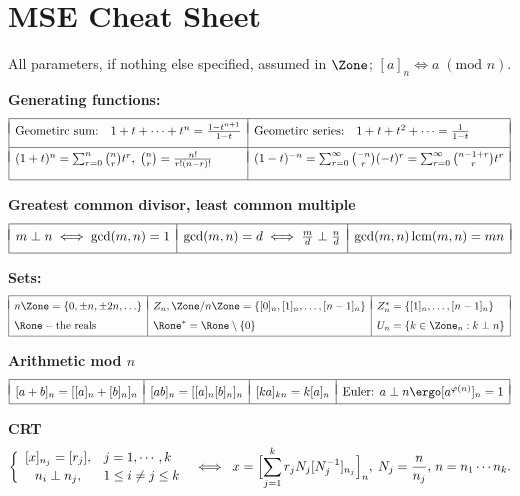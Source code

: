 \documentclass[a4paper]{article}
\begin{document}
\section*{MSE Cheat Sheet}

All parameters, if nothing else specified, assumed in $\Zone$; $[a]_n \iff a\; (\mbox{mod } n)$.

\textbf{Generating functions:}
\[
  \begin{array}[t]{|ll|ll|}
    \hline
    &&& \\[-9pt]
    \mbox{Geometirc sum:} & 1+t+\cdots+t^n = \frac{1-t^{n+1}}{1-t} &
    \mbox{Geometirc series:} & 1+t+t^2+\cdots = \frac{1}{1-t}
    \\[7pt]\hline
    &&& \\[-9pt]
    \multicolumn{2}{|l|}{(1+t)^n = \sum_{r=0}^{n} \binom nr t^r, \; \binom nr = \frac{n!}{r!(n-r)!}} &
    \multicolumn{2}{l|}{(1-t)^{-n} = \sum_{r=0}^{\infty} \binom {-n}r (-t)^r = \sum_{r=0}^{\infty}\binom {n-1+r}r t^r}
    \\[11pt]\hline

  \end{array}
\]


\textbf{Greatest common divisor, least common multiple}
\[
  \begin{array}[t]{|*{3}{l|}}
    \hline
    && \\[-8pt]
    m\perp n \iff \gcd(m,n)=1 & \gcd(m,n) = d \iff \frac md\perp\frac nd & \gcd(m,n)\,\mbox{lcm}(m,n) = mn
 \\[6pt] \hline
  \end{array}
\]

\textbf{Sets:}
\[
  \begin{array}[t]{|*{3}{l|}}
 \hline
    && \\[-8pt]
   n\Zone = \{0,\pm n,\pm 2n,\ldots \}
 & Z_n,\Zone/n\Zone = \{[0]_n,[1]_n,\ldots,[n-1]_n\}
 & Z_n^* = \{[1]_n,\ldots,[n-1]_n\} \\[6pt]
   \Rone - \mbox{the reals}
 & \Rone^* = \Rone\setminus\{0\}
 & U_n = \{k\in\Zone_n: k\perp n\}
 \\[3pt] \hline
  \end{array}
\]

\textbf{}

\textbf{Arithmetic mod $n$}
\[
  \begin{array}[t]{|*{4}{l|}}
    \hline
    &&& \\[-8pt]
    [a+b]_n = [[a]_n + [b]_n]_n &
    [ab]_n = [[a]_n[b]_n]_n &
    [ka]_{kn} = k [a]_n &
    \mbox{Euler: }a\perp n \ergo [a^{\varphi(n)}]_n = 1
    \\[3pt] \hline
  \end{array}
\]

\textbf{CRT}
\[
  \left\{
  \begin{array}{ll}
    [x]_{n_j} = [r_j],& j=1,\cdots,k \\[2pt]
  \hfil n_i\perp n_j ,& 1\le i\neq j\le k
  \end{array}\right.
\;\iff\;
x = \Bigl[ \sum_{j=1}^{k} r_jN_j[N_j^{-1}]_{n_j} \Bigr]_n, \; N_j= \frac{n}{n_j}, \,
    n=n_1\cdots n_k.
\]


\label{LastPageNo}
\end{document}
